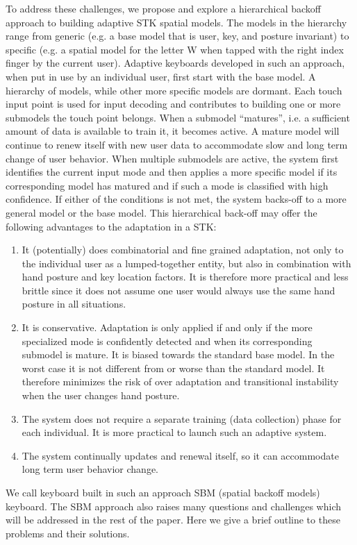 \documentclass{sigchi}
\begin{document}
To address these challenges, we propose and explore a hierarchical backoff approach to building adaptive STK spatial models. The models in the hierarchy range from generic (e.g. a base model that is user, key, and posture invariant) to specific (e.g. a spatial model for the letter W when tapped with the right index finger by the current user). Adaptive keyboards developed in such an approach, when put in use by an individual user, first start with the base model. A hierarchy of models, while other more specific models are dormant. Each touch input point is used for input decoding and contributes to building one or more submodels the touch point belongs. When a submodel “matures”, i.e. a sufficient amount of data is available to train it, it becomes active. A mature model will continue to renew itself with new user data to accommodate  slow and long term change of user behavior. When multiple submodels are active, the system first identifies the current input mode and then applies a more specific model if its corresponding model has matured and if such a mode is classified with high confidence. If either of the conditions is not met, the system backs-off to a more general model or the base model. This hierarchical back-off may offer the following advantages to the adaptation in a STK:
\begin{enumerate}
\item It (potentially) does combinatorial and fine grained adaptation, not only to the individual user as a lumped-together entity, but also in combination with hand posture and key location factors. It is therefore more practical and less brittle since it does not assume one user would always use the same hand posture in all situations.

\item It is conservative. Adaptation is only applied if and only if the more specialized mode is confidently detected and when its corresponding submodel is mature. It is biased towards the standard base model. In the worst case it is not different from or worse than the standard model. It therefore minimizes the risk of over adaptation and transitional instability when the user changes hand posture. 
 
\item The system does not require a separate training (data collection) phase for each individual. It is more practical to launch such an adaptive system.

\item The system continually updates and renewal itself, so it can accommodate long term user behavior change. 
\end{enumerate}
We call keyboard built in such an approach SBM (spatial backoff models) keyboard. The SBM approach also raises many questions and challenges which will be addressed in the rest of the paper. Here we give a brief outline to these problems and their solutions.
\end{document}
